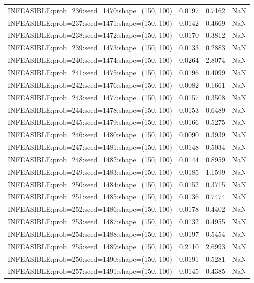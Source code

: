 \begin{longtable}{lccc}
INFEASIBLE:prob=236:seed=1470:shape=(150, 100) &   0.0197 &  0.7162 &    NaN \\
INFEASIBLE:prob=237:seed=1471:shape=(150, 100) &   0.0142 &  0.4669 &    NaN \\
INFEASIBLE:prob=238:seed=1472:shape=(150, 100) &   0.0170 &  0.3812 &    NaN \\
INFEASIBLE:prob=239:seed=1473:shape=(150, 100) &   0.0133 &  0.2883 &    NaN \\
INFEASIBLE:prob=240:seed=1474:shape=(150, 100) &   0.0264 &  2.8074 &    NaN \\
INFEASIBLE:prob=241:seed=1475:shape=(150, 100) &   0.0196 &  0.4099 &    NaN \\
INFEASIBLE:prob=242:seed=1476:shape=(150, 100) &   0.0082 &  0.1661 &    NaN \\
INFEASIBLE:prob=243:seed=1477:shape=(150, 100) &   0.0157 &  0.3508 &    NaN \\
INFEASIBLE:prob=244:seed=1478:shape=(150, 100) &   0.0153 &  0.6489 &    NaN \\
INFEASIBLE:prob=245:seed=1479:shape=(150, 100) &   0.0166 &  0.5275 &    NaN \\
INFEASIBLE:prob=246:seed=1480:shape=(150, 100) &   0.0090 &  0.3939 &    NaN \\
INFEASIBLE:prob=247:seed=1481:shape=(150, 100) &   0.0148 &  0.5034 &    NaN \\
INFEASIBLE:prob=248:seed=1482:shape=(150, 100) &   0.0144 &  0.8959 &    NaN \\
INFEASIBLE:prob=249:seed=1483:shape=(150, 100) &   0.0185 &  1.1599 &    NaN \\
INFEASIBLE:prob=250:seed=1484:shape=(150, 100) &   0.0152 &  0.3715 &    NaN \\
INFEASIBLE:prob=251:seed=1485:shape=(150, 100) &   0.0136 &  0.7474 &    NaN \\
INFEASIBLE:prob=252:seed=1486:shape=(150, 100) &   0.0178 &  0.4402 &    NaN \\
INFEASIBLE:prob=253:seed=1487:shape=(150, 100) &   0.0132 &  0.4955 &    NaN \\
INFEASIBLE:prob=254:seed=1488:shape=(150, 100) &   0.0197 &  0.5454 &    NaN \\
INFEASIBLE:prob=255:seed=1489:shape=(150, 100) &   0.2110 &  2.6993 &    NaN \\
INFEASIBLE:prob=256:seed=1490:shape=(150, 100) &   0.0191 &  0.5281 &    NaN \\
INFEASIBLE:prob=257:seed=1491:shape=(150, 100) &   0.0145 &  0.4385 &    NaN \\

\end{longtable}
